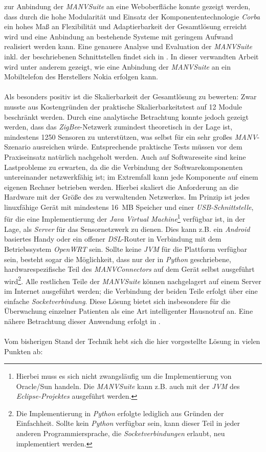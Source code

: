 zur Anbindung der \emph{MANVSuite} an eine Weboberfläche konnte gezeigt werden, dass durch die hohe Modularität
und Einsatz der Komponententechnologie \emph{Corba} ein hohes Maß an Flexibilität und Adaptierbarkeit der
Gesamtlösung erreicht wird und eine Anbindung an bestehende Systeme mit geringem Aufwand realisiert werden kann.
Eine genauere Analyse und Evaluation der \emph{MANVSuite} inkl. der beschriebenen Schnittstellen findet sich
in \cite{Jan}. In dieser verwandten Arbeit wird unter anderem gezeigt, wie eine Anbindung der \emph{MANVSuite}
an ein Mobiltelefon des Herstellers Nokia erfolgen kann.\\
\\
Als besonders positiv ist die Skalierbarkeit der Gesamtlösung zu bewerten: Zwar musste aus Kostengründen 
der praktische Skalierbarkeitstest auf 12 Module beschränkt werden.  Durch eine analytische Betrachtung konnte 
jedoch gezeigt werden, dass das \emph{ZigBee}-Netzwerk zumindest theoretisch in der Lage ist, mindestens 1250 Sensoren
zu unterstützen, was selbst
für ein sehr großes \emph{MANV}-Szenario ausreichen würde.  Entsprechende
praktische Tests müssen vor dem Praxiseinsatz natürlich nachgeholt werden.
Auch auf Softwareseite sind keine Lastprobleme zu erwarten, da
die die Verbindung der Softwarekomponenten untereinander netzwerkfähig ist; im Extremfall kann jede
Komponente auf einem eigenen Rechner betrieben werden. Hierbei skaliert die Anforderung an die Hardware mit
der Größe des zu verwaltenden Netzwerkes. Im Prinzip ist jedes linuxfähige Gerät mit mindestens 16~MB Speicher
und einer \emph{USB-Schnittstelle}, für die eine Implementierung der \emph{Java Virtual Machine}\footnote{Hierbei muss
es sich nicht zwangsläufig um die Implementierung von Oracle/Sun handeln. Die \emph{MANVSuite} kann z.B. auch
mit der \emph{JVM} des \emph{Eclipse-Projektes} ausgeführt werden.} verfügbar ist, in der Lage, als \emph{Server}
für das Sensornetzwerk zu dienen. Dies kann z.B. ein \emph{Android} basiertes Handy oder ein offener
\emph{DSL}-Router in Verbindung mit dem Betriebssystem \emph{OpenWRT} sein. Sollte keine \emph{JVM} für die
Plattform verfügbar sein, besteht sogar die Möglichkeit, dass nur der in \emph{Python} geschriebene,
hardwarespezifische Teil des \emph{MANVConnectors} auf dem Gerät selbst ausgeführt wird\footnote{Die Implementierung
in \emph{Python} erfolgte lediglich aus Gründen der Einfachheit. Sollte kein \emph{Python} verfügbar sein,
kann dieser Teil in jeder anderen Programmiersprache, die \emph{Socketverbindungen} erlaubt, neu implementiert werden.}. 
Alle restlichen Teile der \emph{MANVSuite} können nachgelagert auf einem Server im Internet ausgeführt werden; 
die Verbindung der beiden Teile erfolgt über eine einfache \emph{Socketverbindung}. Diese Lösung bietet sich insbesondere 
für die Überwachung einzelner Patienten als eine Art intelligenter Hausnotruf an. Eine nähere Betrachtung dieser
Anwendung erfolgt in \cite{AAL}.
\\
\\
Vom bisherigen Stand der Technik hebt sich die hier vorgestellte Lösung in vielen Punkten ab:

